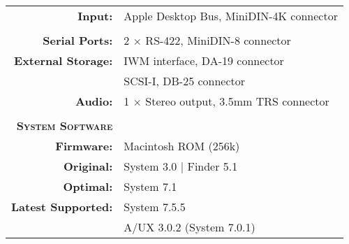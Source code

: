 \begin{tabular}{ r p{6in} }
\\
\textbf{Input:} & Apple Desktop Bus, MiniDIN-4K connector \\
\\
\textbf{Serial Ports:} & 2 \(\times\) RS-422, MiniDIN-8 connector \\
\textbf{External Storage:} & IWM interface, DA-19 connector \\
~ & SCSI-I, DB-25 connector \\
\textbf{Audio:} & 1 \(\times\) Stereo output, 3.5mm TRS connector \\
\\
\textbf{\textsc{System Software}} & ~ \\
\textbf{Firmware:} & Macintosh ROM (256k) \\
\textbf{Original:} & System 3.0 | Finder 5.1 \\
\textbf{Optimal:} & System 7.1 \\
\textbf{Latest Supported:} & System 7.5.5 \\
~ & A/UX 3.0.2 (System 7.0.1) \\
\end{tabular}